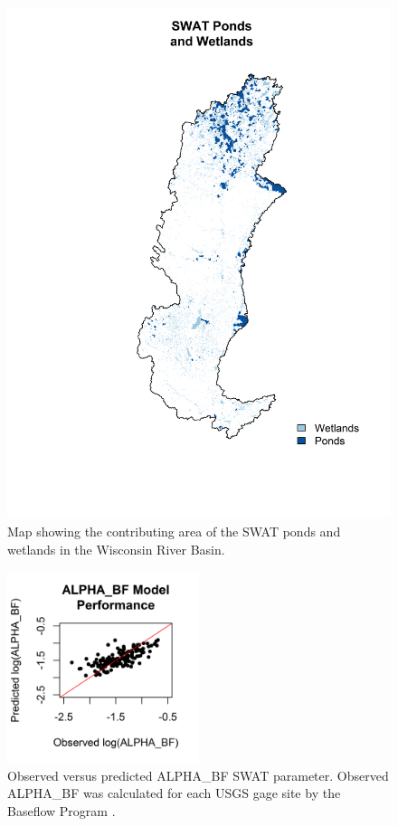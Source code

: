 \begin{figure}[h!]
	\centering
	\includegraphics[width=\textwidth]{./img/wetlands_and_ponds.png}
	\caption[Map showing the contributing area of the SWAT ponds and wetlands]{Map showing the contributing area of the SWAT ponds and wetlands in the Wisconsin River Basin.}
	\label{fig:wetlands_and_ponds}
\end{figure}



\begin{figure}
	\centering
	\includegraphics[width=0.5\textwidth]{./img/alpha_bf_scatterplot.png}
	\caption[Observed versus predicted ALPHA\_BF SWAT parameter]{Observed versus predicted ALPHA\_BF SWAT parameter. Observed ALPHA\_BF was calculated for each USGS gage site  by the Baseflow Program \citep{arnold_automated_1995}.}
	\label{fig:alpha_bf_scatterplot}
\end{figure}

